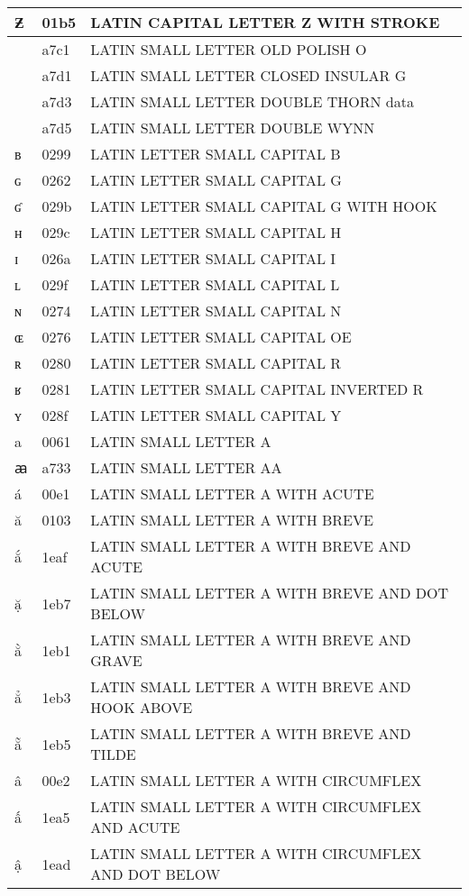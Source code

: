 \documentclass[12pt,letterpaper,openany]{book}
\begin{document}
\begin{center}
\begin{supertabular}{|m{0.25in}|m{0.5in}|m{4in}|}
Ƶ & 01b5 & LATIN CAPITAL LETTER Z WITH STROKE\\\hline
ꟁ & a7c1 & LATIN SMALL LETTER OLD POLISH O\\\hline
ꟑ & a7d1 & LATIN SMALL LETTER CLOSED INSULAR G\\\hline
ꟓ & a7d3 & LATIN SMALL LETTER DOUBLE THORN data\\\hline
ꟕ & a7d5 & LATIN SMALL LETTER DOUBLE WYNN\\\hline
ʙ & 0299 & LATIN LETTER SMALL CAPITAL B\\\hline
ɢ & 0262 & LATIN LETTER SMALL CAPITAL G\\\hline
ʛ & 029b & LATIN LETTER SMALL CAPITAL G WITH HOOK\\\hline
ʜ & 029c & LATIN LETTER SMALL CAPITAL H\\\hline
ɪ & 026a & LATIN LETTER SMALL CAPITAL I\\\hline
ʟ & 029f & LATIN LETTER SMALL CAPITAL L\\\hline
ɴ & 0274 & LATIN LETTER SMALL CAPITAL N\\\hline
ɶ & 0276 & LATIN LETTER SMALL CAPITAL OE\\\hline
ʀ & 0280 & LATIN LETTER SMALL CAPITAL R\\\hline
ʁ & 0281 & LATIN LETTER SMALL CAPITAL INVERTED R\\\hline
ʏ & 028f & LATIN LETTER SMALL CAPITAL Y\\\hline
a & 0061 & LATIN SMALL LETTER A\\\hline
ꜳ & a733 & LATIN SMALL LETTER AA\\\hline
á & 00e1 & LATIN SMALL LETTER A WITH ACUTE\\\hline
ă & 0103 & LATIN SMALL LETTER A WITH BREVE\\\hline
ắ & 1eaf & LATIN SMALL LETTER A WITH BREVE AND ACUTE\\\hline
ặ & 1eb7 & LATIN SMALL LETTER A WITH BREVE AND DOT BELOW\\\hline
ằ & 1eb1 & LATIN SMALL LETTER A WITH BREVE AND GRAVE\\\hline
ẳ & 1eb3 & LATIN SMALL LETTER A WITH BREVE AND HOOK ABOVE\\\hline
ẵ & 1eb5 & LATIN SMALL LETTER A WITH BREVE AND TILDE\\\hline
â & 00e2 & LATIN SMALL LETTER A WITH CIRCUMFLEX\\\hline
ấ & 1ea5 & LATIN SMALL LETTER A WITH CIRCUMFLEX AND ACUTE\\\hline
ậ & 1ead & LATIN \scriptsize SMALL LETTER A WITH CIRCUMFLEX AND DOT BELOW\\\hline

\end{supertabular}
\end{center}
\end{document}
